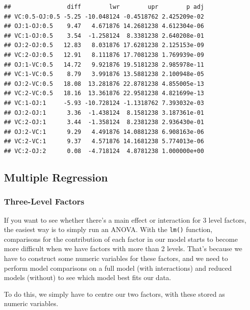 \documentclass[
]{book}
\begin{document}
\begin{verbatim}
##                diff        lwr        upr        p adj
## VC:0.5-OJ:0.5 -5.25 -10.048124 -0.4518762 2.425209e-02
## OJ:1-OJ:0.5    9.47   4.671876 14.2681238 4.612304e-06
## VC:1-OJ:0.5    3.54  -1.258124  8.3381238 2.640208e-01
## OJ:2-OJ:0.5   12.83   8.031876 17.6281238 2.125153e-09
## VC:2-OJ:0.5   12.91   8.111876 17.7081238 1.769939e-09
## OJ:1-VC:0.5   14.72   9.921876 19.5181238 2.985978e-11
## VC:1-VC:0.5    8.79   3.991876 13.5881238 2.100948e-05
## OJ:2-VC:0.5   18.08  13.281876 22.8781238 4.855005e-13
## VC:2-VC:0.5   18.16  13.361876 22.9581238 4.821699e-13
## VC:1-OJ:1     -5.93 -10.728124 -1.1318762 7.393032e-03
## OJ:2-OJ:1      3.36  -1.438124  8.1581238 3.187361e-01
## VC:2-OJ:1      3.44  -1.358124  8.2381238 2.936430e-01
## OJ:2-VC:1      9.29   4.491876 14.0881238 6.908163e-06
## VC:2-VC:1      9.37   4.571876 14.1681238 5.774013e-06
## VC:2-OJ:2      0.08  -4.718124  4.8781238 1.000000e+00
\end{verbatim}

\hypertarget{multiple-regression}{%
\subsection{Multiple Regression}\label{multiple-regression}}

\hypertarget{three-level-factors}{%
\subsubsection{Three-Level Factors}\label{three-level-factors}}

If you want to see whether there's a main effect or interaction for 3 level factors, the easiest way is to simply run an ANOVA. With the \texttt{lm()} function, comparisons for the contribution of each factor in our model starts to become more difficult when we have factors with more than 2 levels. That's because we have to construct some numeric variables for these factors, and we need to perform model comparisons on a full model (with interactions) and reduced models (without) to see which model best fits our data.

To do this, we simply have to centre our two factors, with these stored as numeric variables.
\end{document}
